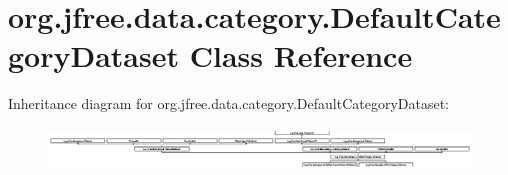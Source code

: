 \hypertarget{classorg_1_1jfree_1_1data_1_1category_1_1_default_category_dataset}{}\section{org.\+jfree.\+data.\+category.\+Default\+Category\+Dataset Class Reference}
\label{classorg_1_1jfree_1_1data_1_1category_1_1_default_category_dataset}
Inheritance diagram for org.\+jfree.\+data.\+category.\+Default\+Category\+Dataset\+:\begin{figure}[H]
\begin{center}
\leavevmode
\includegraphics[height=1.090343cm]{classorg_1_1jfree_1_1data_1_1category_1_1_default_category_dataset}
\end{center}
\end{figure}
